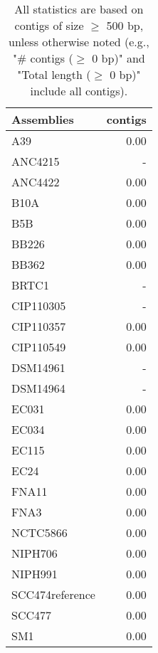 \documentclass[12pt,a4paper]{article}
\begin{document}
\begin{table}[ht]
\begin{center}
\caption{All statistics are based on contigs of size $\geq$ 500 bp, unless otherwise noted (e.g., "\# contigs ($\geq$ 0 bp)" and "Total length ($\geq$ 0 bp)" include all contigs).}
\begin{tabular}{|l*{1}{|r}|}
\hline
Assemblies & contigs \\ \hline
A39 & 0.00 \\ \hline
ANC4215 & - \\ \hline
ANC4422 & 0.00 \\ \hline
B10A & 0.00 \\ \hline
B5B & 0.00 \\ \hline
BB226 & 0.00 \\ \hline
BB362 & 0.00 \\ \hline
BRTC1 & - \\ \hline
CIP110305 & - \\ \hline
CIP110357 & 0.00 \\ \hline
CIP110549 & 0.00 \\ \hline
DSM14961 & - \\ \hline
DSM14964 & - \\ \hline
EC031 & 0.00 \\ \hline
EC034 & 0.00 \\ \hline
EC115 & 0.00 \\ \hline
EC24 & 0.00 \\ \hline
FNA11 & 0.00 \\ \hline
FNA3 & 0.00 \\ \hline
NCTC5866 & 0.00 \\ \hline
NIPH706 & 0.00 \\ \hline
NIPH991 & 0.00 \\ \hline
SCC474reference & 0.00 \\ \hline
SCC477 & 0.00 \\ \hline
SM1 & 0.00 \\ \hline
\end{tabular}
\end{center}
\end{table}
\end{document}
